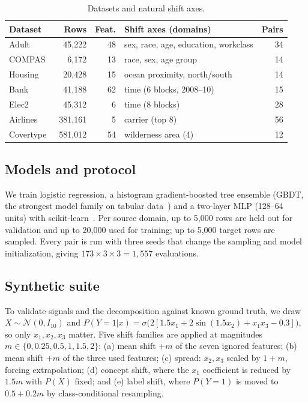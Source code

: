 \documentclass[conference]{IEEEtran}
\theoremstyle{plainhead}
\begin{document}
\begin{table}[t]
\centering
\caption{Datasets and natural shift axes.}
\label{tab:data}
\footnotesize
\setlength{\tabcolsep}{3pt}
\begin{tabular}{lrrlr}
\toprule
Dataset & Rows & Feat. & Shift axes (domains) & Pairs \\
\midrule
Adult~\cite{kohavi1996scaling} & 45{,}222 & 48 & sex, race, age, education, workclass & 34 \\
COMPAS~\cite{angwin2016machine} & 6{,}172 & 13 & race, sex, age group & 14 \\
Housing~\cite{pace1997sparse} & 20{,}428 & 15 & ocean proximity, north/south & 14 \\
Bank~\cite{moro2014data} & 41{,}188 & 62 & time (6 blocks, 2008--10) & 15 \\
Elec2~\cite{harries1999splice} & 45{,}312 & 6 & time (8 blocks) & 28 \\
Airlines~\cite{ikonomovska2011learning} & 381{,}161 & 5 & carrier (top 8) & 56 \\
Covertype~\cite{blackard1999comparative} & 581{,}012 & 54 & wilderness area (4) & 12 \\
\bottomrule
\end{tabular}
\end{table}

\subsection{Models and protocol}
We train logistic regression, a histogram gradient-boosted tree ensemble (GBDT, the strongest model family on tabular data~\cite{grinsztajn2022tree,ke2017lightgbm}) and a two-layer MLP (128--64 units) with scikit-learn~\cite{pedregosa2011scikit}. Per source domain, up to 5{,}000 rows are held out for validation and up to 20{,}000 used for training; up to 5{,}000 target rows are sampled. Every pair is run with three seeds that change the sampling and model initialization, giving $173\times3\times3 = 1{,}557$ evaluations.

\subsection{Synthetic suite}
To validate signals and the decomposition against known ground truth, we draw $X\sim\mathcal{N}(0,I_{10})$ and $P(Y{=}1|x)=\sigma\big(2[1.5x_1+2\sin(1.5x_2)+x_1x_3-0.3]\big)$, so only $x_1,x_2,x_3$ matter. Five shift families are applied at magnitudes $m\in\{0,0.25,0.5,1,1.5,2\}$: (a) mean shift $+m$ of the seven ignored features; (b) mean shift $+m$ of the three used features; (c) spread: $x_2,x_3$ scaled by $1{+}m$, forcing extrapolation; (d) concept shift, where the $x_1$ coefficient is reduced by $1.5m$ with $P(X)$ fixed; and (e) label shift, where $P(Y{=}1)$ is moved to $0.5{+}0.2m$ by class-conditional resampling.
\end{document}

